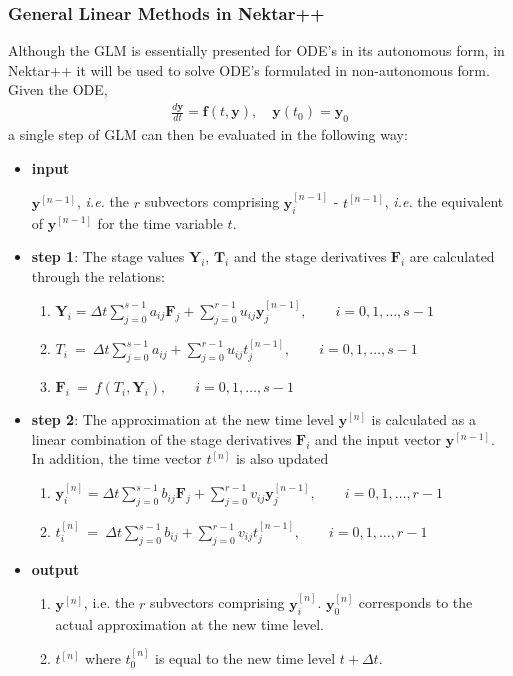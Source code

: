 \subsubsection{General Linear Methods in Nektar++}
Although the GLM is essentially presented for ODE's in its autonomous form, in
Nektar++ it will be used to solve ODE's formulated in non-autonomous form.
Given the ODE,
\begin{align*}
\frac{d\boldsymbol{y}}{dt}=\boldsymbol{f}(t,\boldsymbol{y}),\quad
\boldsymbol{y}(t_0)=\boldsymbol{y}_0
\end{align*}
a single step of GLM can then be evaluated in the following way:
\begin{itemize}
\item \textbf{input}

$\boldsymbol{y}^{[n-1]}$, \emph{i.e.} the $r$
    subvectors comprising $\boldsymbol{y}^{[n-1]}_i$ -
    $t^{[n-1]}$, \emph{i.e.} the equivalent of
    $\boldsymbol{y}^{[n-1]}$ for the time variable $t$.

\item \textbf{step 1}: The stage values $\boldsymbol{Y}_i$,
$\boldsymbol{T}_i$ and the stage derivatives
$\boldsymbol{F}_i$ are calculated through the relations:
\begin{enumerate}
\item $\boldsymbol{Y}_i = \Delta
    t\sum_{j=0}^{s-1}a_{ij}\boldsymbol{F}_j+\sum_{j=0}^{r-1}u_{ij}\boldsymbol{y}_{j}^{[n-1]},
    \qquad i=0,1,\ldots,s-1$
\item $T_i\ =\ \Delta
    t\sum_{j=0}^{s-1}a_{ij}+\sum_{j=0}^{r-1}u_{ij}t_{j}^{[n-1]}, \qquad
    i=0,1,\ldots,s-1$
\item $\boldsymbol{F}_i\ =\
    f(T_i,\boldsymbol{Y}_i), \qquad i=0,1,\ldots,s-1$
\end{enumerate}

\item \textbf{step 2}: The approximation at the new time level
$\boldsymbol{y}^{[n]}$ is calculated as a linear combination of the
stage derivatives $\boldsymbol{F}_i$ and the input vector
$\boldsymbol{y}^{[n-1]}$. In addition, the time vector
$t^{[n]}$ is also updated

\begin{enumerate}
\item $\boldsymbol{y}_{i}^{[n]} = \Delta
    t\sum_{j=0}^{s-1}b_{ij}\boldsymbol{F}_j+\sum_{j=0}^{r-1}v_{ij}\boldsymbol{y}_{j}^{[n-1]},
    \qquad i=0,1,\ldots,r-1$
\item $t_{i}^{[n]}\ =\ \Delta
    t\sum_{j=0}^{s-1}b_{ij}+\sum_{j=0}^{r-1}v_{ij}t_{j}^{[n-1]}, \qquad
    i=0,1,\ldots,r-1$
\end{enumerate}

\item \textbf{output}
\begin{enumerate}
\item $\boldsymbol{y}^{[n]}$, i.e. the $r$ subvectors
    comprising $\boldsymbol{y}^{[n]}_i$.
    $\boldsymbol{y}^{[n]}_0$ corresponds to the actual approximation
    at the new time level.
\item $t^{[n]}$ where $t^{[n]}_0$ is equal to the new time
    level $t+\Delta t$.
\end{enumerate}
\end{itemize}

